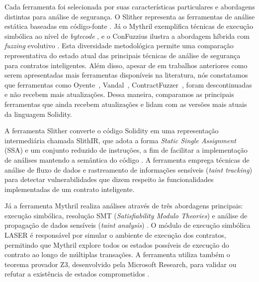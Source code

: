 \documentclass[12pt]{article}
\begin{document}
Cada ferramenta foi selecionada por suas características particulares e abordagens distintas para análise de segurança. O Slither representa as ferramentas de análise estática baseadas em código-fonte \cite{feist2019slither}. Já o Mythril exemplifica técnicas de execução simbólica ao nível de \textit{bytecode} \cite{mythril2018}, e o ConFuzzius ilustra a abordagem híbrida com \textit{fuzzing} evolutivo \cite{9581164}. Esta diversidade metodológica permite uma comparação representativa do estado atual das principais técnicas de análise de segurança para contratos inteligentes. Além disso, apesar de em trabalhos anteriores como~\cite{kushwaha2022ethereum} serem apresentadas mais ferramentas disponíveis na literatura, nós constatamos que ferramentas como Oyente~\cite{luu2016making}, Vandal~\cite{brent2018vandal}, ContractFuzzer~\cite{jiang2018contractfuzzer}, foram descontinuadas e não recebem mais atualizações. Dessa maneira, comparamos as principais ferramentas que ainda recebem atualizações e lidam com as versões mais atuais da linguagem Solidity.


A ferramenta Slither converte o código Solidity em uma representação intermediária chamada SlithIR, que adota a forma \textit{Static Single Assignment} (SSA) e um conjunto reduzido de instruções, a fim de facilitar a implementação de análises mantendo a semântica do código \cite{feist2019slither}. A ferramenta emprega técnicas de análise de fluxo de dados e rastreamento de informações sensíveis (\textit{taint tracking}) para detectar vulnerabilidades que dizem respeito às funcionalidades implementadas de um contrato inteligente.


Já a ferramenta Mythril realiza análises através de três abordagens principais: execução simbólica, resolução SMT (\textit{Satisfiability Modulo Theories}) e análise de propagação de dados sensíveis (\textit{taint analysis}) \cite{kushwaha2022ethereum}. O módulo de execução simbólica LASER é responsável por simular o ambiente de execução dos contratos, permitindo que Mythril explore todos os estados possíveis de execução do contrato ao longo de múltiplas transações. A ferramenta utiliza também o teorema provador Z3, desenvolvido pela Microsoft Research, para validar ou refutar a existência de estados comprometidos \cite{sharma2022survey}.
\end{document}
